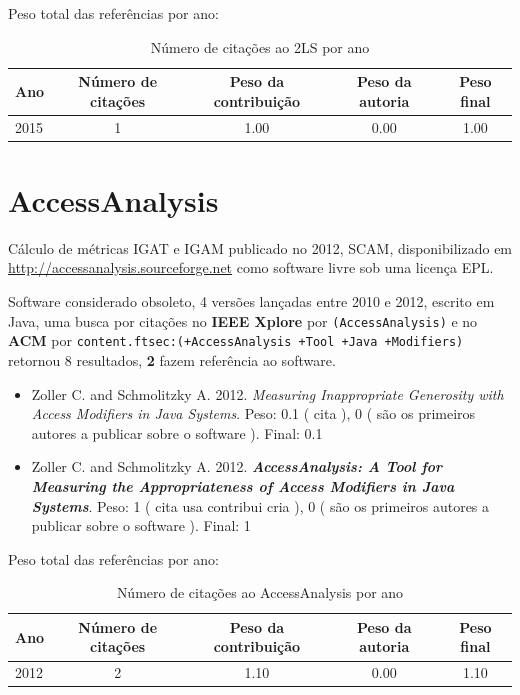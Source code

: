 Peso total das referências por ano:

\begin{table}[h]
\caption{Número de citações ao 2LS  por ano}
\centering
\begin{tabular}{| l | c | c | c | c |}
  \hline
  Ano & Número de citações & Peso da contribuição & Peso da autoria & Peso final \\
  \hline
  2015
    & 1
    & 1.00
    & 0.00
    & 1.00 \\
  \hline
\end{tabular}
\end{table}


\section{AccessAnalysis}

Cálculo de métricas IGAT e IGAM
publicado no 2012, SCAM,
disponibilizado em \url{http://accessanalysis.sourceforge.net}
como software livre
sob uma licença EPL.

Software considerado obsoleto,
4 versões lançadas
entre 2010 e 2012,
escrito em Java,
uma busca por citações no {\bf IEEE Xplore} por
\texttt{(AccessAnalysis)}
e no {\bf ACM} por
\texttt{content.ftsec:(+AccessAnalysis +Tool +Java +Modifiers)}
retornou
8 resultados,
{\bf 2} fazem referência ao software.

\begin{itemize}
\item Zoller C. and Schmolitzky A.
      2012.
        \textit{ Measuring Inappropriate Generosity with Access Modifiers in Java Systems}.
      Peso:
      0.1 (
          cita
      ),
      0 (
são os primeiros autores a publicar sobre o software
      ).
      Final:
      0.1

\item Zoller C. and Schmolitzky A.
      2012.
        \textbf{\textit{ AccessAnalysis: A Tool for Measuring the Appropriateness of Access Modifiers in Java Systems}}.
      Peso:
      1 (
          cita
          usa
          contribui
          cria
      ),
      0 (
são os primeiros autores a publicar sobre o software
      ).
      Final:
      1

\end{itemize}

Peso total das referências por ano:

\begin{table}[h]
\caption{Número de citações ao AccessAnalysis por ano}
\centering
\begin{tabular}{| l | c | c | c | c |}
  \hline
  Ano & Número de citações & Peso da contribuição & Peso da autoria & Peso final \\
  \hline
  2012
    & 2
    & 1.10
    & 0.00
    & 1.10 \\
  \hline
\end{tabular}
\end{table}


